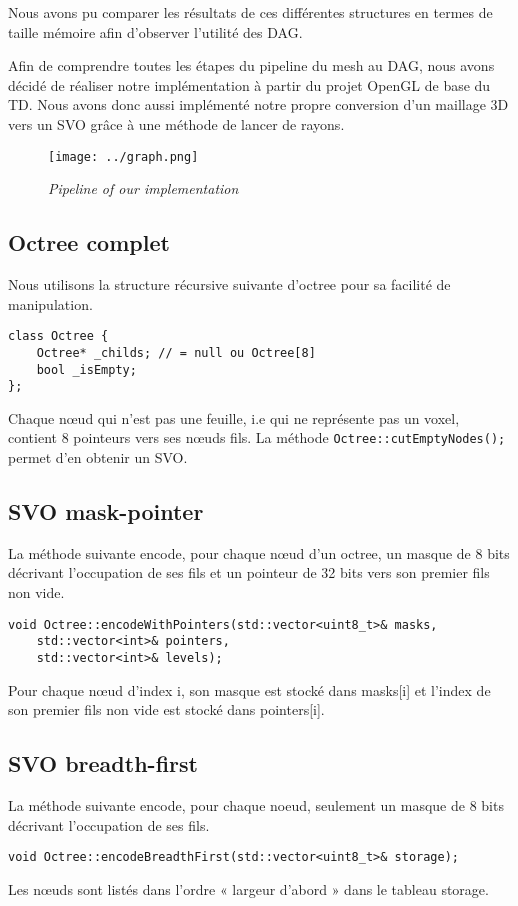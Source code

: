 \documentclass[a4paper]{article}
\begin{document}
Nous avons pu comparer les résultats de ces différentes structures en termes de taille mémoire afin d'observer l'utilité des DAG.


Afin de comprendre toutes les étapes du pipeline du mesh au DAG, nous avons décidé de réaliser notre implémentation à partir du projet OpenGL de base du TD. Nous avons donc aussi implémenté notre propre conversion d’un maillage 3D vers un SVO grâce à une méthode de lancer de rayons.

\begin{figure}
\centering
\texttt{[image: ../graph.png]}
\caption{\label{fig:triceratops}\textit{Pipeline of our implementation}}
\end{figure}

\subsection{Octree complet}

Nous utilisons la structure récursive suivante d’octree pour sa facilité de manipulation.

\begin{lstlisting}
class Octree {
	Octree* _childs; // = null ou Octree[8]
	bool _isEmpty;
};
\end{lstlisting}

Chaque nœud qui n’est pas une feuille, i.e qui ne représente pas un voxel, contient 8 pointeurs vers ses nœuds fils. La méthode \texttt{Octree::cutEmptyNodes();} permet d’en obtenir un SVO. 

\subsection{SVO mask-pointer}

La méthode suivante encode, pour chaque nœud d'un octree, un masque de 8 bits décrivant l’occupation de ses fils et un pointeur de 32 bits vers son premier fils non vide. 

\begin{lstlisting}
void Octree::encodeWithPointers(std::vector<uint8_t>& masks, 
	std::vector<int>& pointers, 
	std::vector<int>& levels);
\end{lstlisting}

Pour chaque nœud d'index i, son masque est stocké dans masks[i] et l’index de son premier fils non vide est stocké dans pointers[i].

\subsection{SVO breadth-first}

La méthode suivante encode, pour chaque noeud, seulement un masque de 8 bits décrivant l’occupation de ses fils.

\begin{lstlisting}
void Octree::encodeBreadthFirst(std::vector<uint8_t>& storage);
\end{lstlisting}
 
Les nœuds sont listés dans l’ordre « largeur d’abord » dans le tableau storage.
\end{document}
